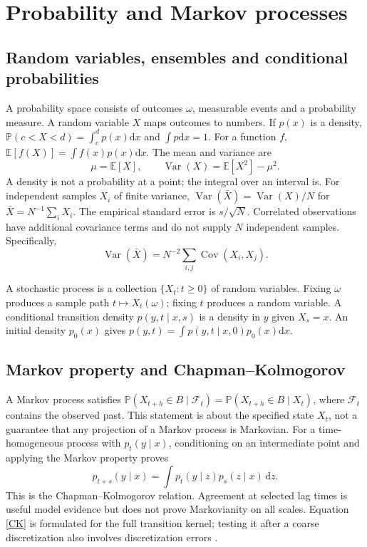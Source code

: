 \documentclass[11pt,a4paper]{article}
\newcommand{\dd}{\mathrm d}
\newcommand{\E}{\mathbb E}
\newcommand{\Pp}{\mathbb P}
\theoremstyle{remark}\newtheorem*{remark}{Physical interpretation}
\begin{document}
\section{Probability and Markov processes}
\subsection{Random variables, ensembles and conditional probabilities}
A probability space consists of outcomes $\omega$, measurable events and a probability measure. A random variable $X$ maps outcomes to numbers. If $p(x)$ is a density, $\Pp(c<X<d)=\int_c^d p(x)\dd x$ and $\int p\dd x=1$. For a function $f$, $\E[f(X)]=\int f(x)p(x)\dd x$. The mean and variance are
\begin{equation}
\mu=\E[X],\qquad \operatorname{Var}(X)=\E[X^2]-\mu^2.
\end{equation}
A density is not a probability at a point; the integral over an interval is. For independent samples $X_i$ of finite variance, $\operatorname{Var}(\bar X)=\operatorname{Var}(X)/N$ for $\bar X=N^{-1}\sum_iX_i$. The empirical standard error is $s/\sqrt N$. Correlated observations have additional covariance terms and do not supply $N$ independent samples. Specifically,
\begin{equation}\operatorname{Var}(\bar X)=N^{-2}\sum_{i,j}\operatorname{Cov}(X_i,X_j).\end{equation}

A stochastic process is a collection $\{X_t:t\geq0\}$ of random variables. Fixing $\omega$ produces a sample path $t\mapsto X_t(\omega)$; fixing $t$ produces a random variable. A conditional transition density $p(y,t\mid x,s)$ is a density in $y$ given $X_s=x$. An initial density $p_0(x)$ gives $p(y,t)=\int p(y,t\mid x,0)p_0(x)\dd x$.

\subsection{Markov property and Chapman--Kolmogorov}
A Markov process satisfies $\Pp(X_{t+h}\in B\mid\mathcal F_t)=\Pp(X_{t+h}\in B\mid X_t)$, where $\mathcal F_t$ contains the observed past. This statement is about the specified state $X_t$, not a guarantee that any projection of a Markov process is Markovian. For a time-homogeneous process with $p_t(y\mid x)$, conditioning on an intermediate point and applying the Markov property proves
\begin{equation}\label{CK}
p_{t+s}(y\mid x)=\int p_t(y\mid z)p_s(z\mid x)\,\dd z.
\end{equation}
This is the Chapman--Kolmogorov relation. Agreement at selected lag times is useful model evidence but does not prove Markovianity on all scales. Equation \eqref{CK} is formulated for the full transition kernel; testing it after a coarse discretization also involves discretization errors \cite{vankampen}.
\end{document}
